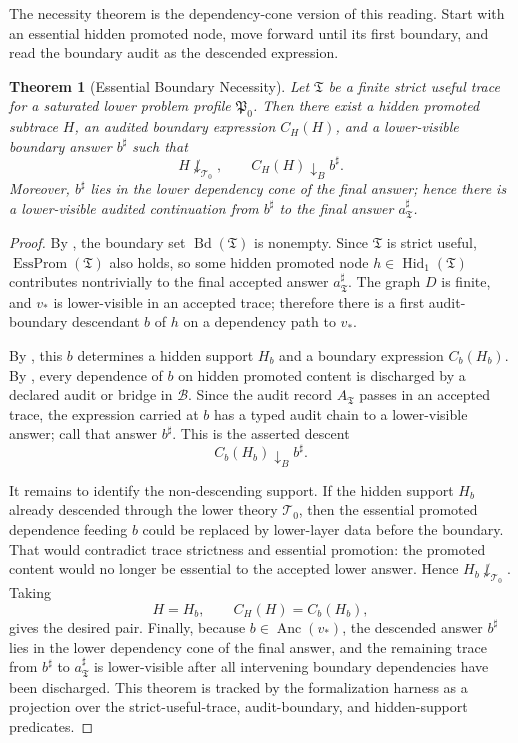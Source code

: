 \documentclass[11pt]{article}
\newcommand{\EssProm}{\operatorname{EssProm}}
\newcommand{\Anc}{\operatorname{Anc}}
\newcommand{\Hid}{\operatorname{Hid}}
\newcommand{\Bd}{\operatorname{Bd}}
\newtheorem{theorem}{Theorem}[section]
\theoremstyle{definition}
\begin{document}
The necessity theorem is the dependency-cone version of this reading.  Start
with an essential hidden promoted node, move forward until its first boundary,
and read the boundary audit as the descended expression.

\begin{theorem}[Essential Boundary Necessity]
\label{thm:sau-essential-boundary-necessity}
Let \(\mathfrak T\) be a finite strict useful trace for a saturated lower problem profile \(\mathfrak P_0\).  Then there exist a hidden promoted subtrace \(H\), an audited boundary expression \(C_H(H)\), and a lower-visible boundary answer \(b^\sharp\) such that
\[
H\not\downarrow_{\mathcal T_0},
\qquad
C_H(H)\downarrow_B b^\sharp.
\]
Moreover, \(b^\sharp\) lies in the lower dependency cone of the final answer; hence there is a lower-visible audited continuation from \(b^\sharp\) to the final answer \(a^\sharp_{\mathfrak T}\).
\end{theorem}

\begin{proof}
By , the boundary set \(\Bd(\mathfrak T)\) is
nonempty.  Since \(\mathfrak T\) is strict useful, \(\EssProm(\mathfrak T)\)
also holds, so some hidden promoted node \(h\in\Hid_1(\mathfrak T)\) contributes
nontrivially to the final accepted answer \(a^\sharp_{\mathfrak T}\).  The graph
\(D\) is finite, and \(v_\ast\) is lower-visible in an accepted trace; therefore
there is a first audit-boundary descendant \(b\) of \(h\) on a dependency path
to \(v_\ast\).

By , this \(b\) determines a hidden support
\(H_b\) and a boundary expression \(C_b(H_b)\).  By
, every dependence of \(b\) on hidden promoted
content is discharged by a declared audit or bridge in \(\mathcal B\).  Since
the audit record \(A_{\mathfrak T}\) passes in an accepted trace, the expression
carried at \(b\) has a typed audit chain to a lower-visible answer; call that
answer \(b^\sharp\).  This is the asserted descent
\[
C_b(H_b)\downarrow_B b^\sharp.
\]

It remains to identify the non-descending support.  If the hidden support
\(H_b\) already descended through the lower theory \(\mathcal T_0\), then the
essential promoted dependence feeding \(b\) could be replaced by lower-layer
data before the boundary.  That would contradict trace strictness and essential
promotion: the promoted content would no longer be essential to the accepted
lower answer.  Hence \(H_b\not\downarrow_{\mathcal T_0}\).  Taking
\[
H=H_b,
\qquad
C_H(H)=C_b(H_b),
\]
gives the desired pair.  Finally, because \(b\in\Anc(v_\ast)\), the descended
answer \(b^\sharp\) lies in the lower dependency cone of the final answer, and
the remaining trace from \(b^\sharp\) to \(a^\sharp_{\mathfrak T}\) is
lower-visible after all intervening boundary dependencies have been discharged.
This theorem is tracked by the formalization harness as a projection over the
strict-useful-trace, audit-boundary, and hidden-support predicates.
\end{proof}
\end{document}
